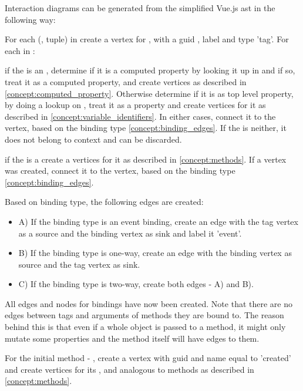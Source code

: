 Interaction diagrams can be generated from the simplified Vue.js \gls{ast} in the following way:

For each  (, tuple) in  create a vertex for , with a \gls{guid} , label  and type 'tag'. For each  in :

if the  is an , determine if it is a computed property by looking it up in  and if so, treat it as a computed property, and create vertices as described in \ref{concept:computed_property}. Otherwise determine if it is as top level property, by doing a lookup on , treat it as a property and create vertices for it as described in \ref{concept:variable_identifiers}. In either cases, connect it to the  vertex, based on the binding type \ref{concept:binding_edges}. If the  is neither, it does not belong to context and can be discarded. 

if the  is a  create a vertices for it as described in \ref{concept:methods}. If a vertex was created, connect it to the  vertex, based on the binding type \ref{concept:binding_edges}.

Based on binding type, the following edges are created:
\label{concept:binding_edges}
\begin{itemize}
\item A) If the binding type is an event binding, create an edge with the tag vertex as a source and the binding vertex as sink and label it 'event'. 
\item B) If the binding type is one-way, create an edge with the binding vertex as source and the tag vertex as sink.
\item C) If the binding type is two-way, create both edges - A) and B).
\end{itemize}
All edges and nodes for bindings have now been created. Note that there are no edges between tags and arguments of methods they are bound to. The reason behind this is that even if a whole object is passed to a method, it might only mutate some properties and the method itself will have edges to them.


For the initial method - , create a vertex with \gls{guid} and name equal to 'created' and create vertices for its ,  and  analogous to methods as described in \ref{concept:methods}. 


